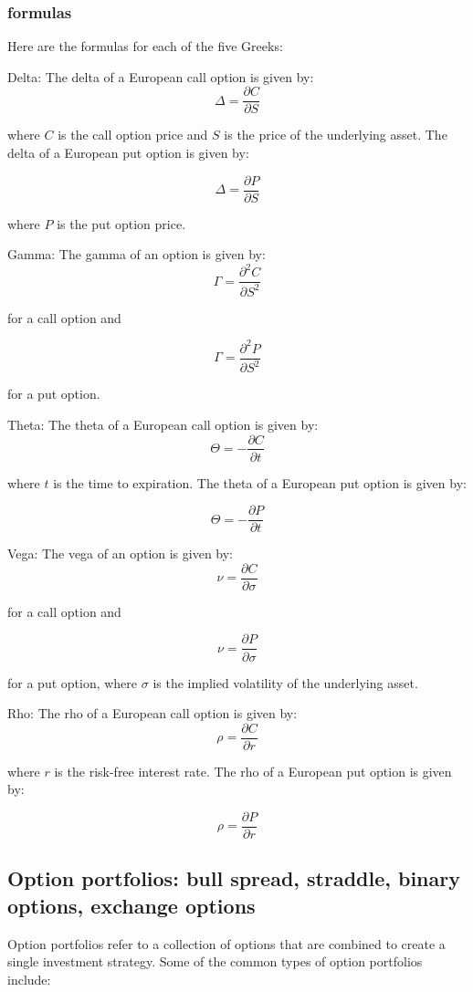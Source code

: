 \documentclass[12pt, a4paper, oneside]{article}
\begin{document}
\subsubsection{formulas }
Here are the formulas for each of the five Greeks:

Delta: The delta of a European call option is given by:
$$\Delta = \frac{\partial C}{\partial S}$$

where $C$ is the call option price and $S$ is the price of the underlying asset. The delta of a European put option is given by:

$$\Delta = \frac{\partial P}{\partial S}$$

where $P$ is the put option price.

Gamma: The gamma of an option is given by:
$$\Gamma = \frac{\partial^2 C}{\partial S^2}$$

for a call option and

$$\Gamma = \frac{\partial^2 P}{\partial S^2}$$

for a put option.

Theta: The theta of a European call option is given by:
$$\Theta = -\frac{\partial C}{\partial t}$$

where $t$ is the time to expiration. The theta of a European put option is given by:

$$\Theta = -\frac{\partial P}{\partial t}$$

Vega: The vega of an option is given by:
$$\nu = \frac{\partial C}{\partial \sigma}$$

for a call option and

$$\nu = \frac{\partial P}{\partial \sigma}$$

for a put option, where $\sigma$ is the implied volatility of the underlying asset.

Rho: The rho of a European call option is given by:
$$\rho = \frac{\partial C}{\partial r}$$

where $r$ is the risk-free interest rate. The rho of a European put option is given by:

$$\rho = \frac{\partial P}{\partial r}$$


\subsection{ Option portfolios: bull spread, straddle, binary options, exchange options }
Option portfolios refer to a collection of options that are combined to create a single investment strategy. Some of the common types of option portfolios include:
\end{document}
